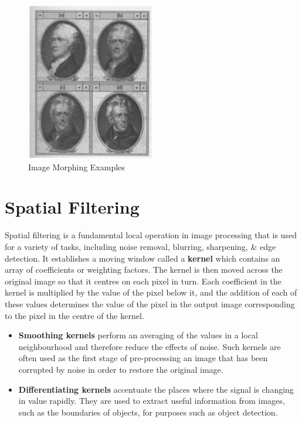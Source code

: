 \documentclass[a4paper,11pt]{article}
\begin{document}
\begin{figure}[H]
    \centering
    \includegraphics[width=0.5\textwidth]{images/image_morphing.png}
    \caption{Image Morphing Examples}
\end{figure}

\section{Spatial Filtering}
Spatial filtering is a fundamental local operation in image processing that is used for a variety of tasks, including noise removal, blurring, sharpening, \& edge detection.
It establishes a moving window called a \textbf{kernel} which contains an array of coefficients or weighting factors.
The kernel is then moved across the original image so that it centres on each pixel in turn.
Each coefficient in the kernel is multiplied by the value of the pixel below it, and the addition of each of these values determines the value of the pixel in the output image corresponding to the pixel in the centre of the kernel. 
\begin{itemize}
    \item   \textbf{Smoothing kernels} perform an averaging of the values in a local neighbourhood and therefore reduce the effects of noise.
            Such kernels are often used as the first stage of pre-processing an image that has been corrupted by noise in order to restore the original image.
    \item   \textbf{Differentiating kernels} accentuate the places where the signal is changing in value rapidly.
            They are used to extract useful information from images, such as the boundaries of objects, for purposes such as object detection.
\end{itemize}
\end{document}
